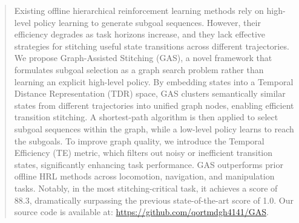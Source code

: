 \documentclass{article}
\begin{document}
\frenchspacing 
{}
\printAffiliationsAndNotice{} 


\begin{abstract}
Existing offline hierarchical reinforcement learning methods rely on high-level policy learning to generate subgoal sequences. However, their efficiency degrades as task horizons increase, and they lack effective strategies for stitching useful state transitions across different trajectories. We propose Graph-Assisted Stitching (GAS), a novel framework that formulates subgoal selection as a graph search problem rather than learning an explicit high-level policy. By embedding states into a Temporal Distance Representation (TDR) space, GAS clusters semantically similar states from different trajectories into unified graph nodes, enabling efficient transition stitching. A shortest-path algorithm is then applied to select subgoal sequences within the graph, while a low-level policy learns to reach the subgoals. To improve graph quality, we introduce the Temporal Efficiency (TE) metric, which filters out noisy or inefficient transition states, significantly enhancing task performance. GAS outperforms prior offline HRL methods across locomotion, navigation, and manipulation tasks. Notably, in the most stitching-critical task, it achieves a score of 88.3, dramatically surpassing the previous state-of-the-art score of 1.0. Our source code is available at: \url{https://github.com/qortmdgh4141/GAS}.
\end{abstract}
\end{document}
